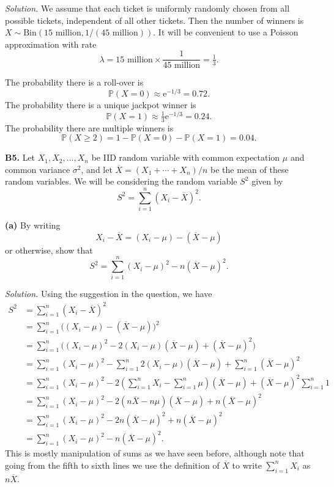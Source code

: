 \documentclass[
  a4paper,
]{book}
\theoremstyle{definition}
\theoremstyle{definition}
\theoremstyle{definition}
\theoremstyle{definition}
\theoremstyle{remark}
\begin{document}
\begin{myanswers}
\emph{Solution.}
We assume that each ticket is uniformly randomly chosen from all possible tickets, independent of all other tickets. Then the number of winners is \(X \sim \text{Bin}(15 \text{ million}, 1/(45 \text{ million}))\).
It will be convenient to use a Poisson approximation with rate
\[ \lambda = 15 \text{ million} \times \frac{1}{45 \text{ million}} = \tfrac13 .  \]

The probability there is a roll-over is
\[ \mathbb P(X = 0) \approx \mathrm e^{-1/3} = 0.72 . \]
The probability there is a unique jackpot winner is
\[ \mathbb P(X = 1) \approx \tfrac13 \mathrm e^{-1/3} = 0.24 . \]
The probability there are multiple winners is
\[ \mathbb P(X \geq 2) = 1 - \mathbb P(X = 0) - \mathbb P(X = 1) = 0.04  . \]

\end{myanswers}

\textbf{B5.} Let \(X_1, X_2, \dots, X_n\) be IID random variable with common expectation \(\mu\) and common variance \(\sigma^2\), and let \(\overline X = (X_1 + \cdots + X_n)/n\) be the mean of these random variables. We will be considering the random variable \(S^2\) given by
\[ S^2 = \sum_{i=1}^n (X_i - \overline X)^2 . \]

\textbf{(a)} By writing
\[ X_i - \overline X = (X_i - \mu) - (\overline X - \mu)  \]
or otherwise, show that
\[ S^2 = \sum_{i=1}^n (X_i - \mu)^2 - n(\overline X - \mu)^2 . \]

\begin{myanswers}
\emph{Solution.}
Using the suggestion in the question, we have
\begin{align*}
S^2 &= \sum_{i=1}^n (X_i - \overline X)^2 \\
  &= \sum_{i=1}^n \big( (X_i - \mu) - (\overline X - \mu)  \big)^2 \\
  &= \sum_{i=1}^n \big( (X_i - \mu)^2 - 2(X_i - \mu)(\overline X - \mu) + (\overline X - \mu)^2\big) \\
  &= \sum_{i=1}^n (X_i - \mu)^2 - \sum_{i=1}^n 2(X_i - \mu)(\overline X - \mu) + \sum_{i=1}^n (\overline X - \mu)^2 \\
  &= \sum_{i=1}^n (X_i - \mu)^2 - 2\left(\sum_{i=1}^n X_i - \sum_{i=1}^n \mu\right)(\overline X - \mu)  + (\overline X - \mu)^2 \sum_{i=1}^n 1 \\
  &= \sum_{i=1}^n (X_i - \mu)^2 - 2(n\overline X - n\mu) (\overline X - \mu) + n (\overline X - \mu)^2 \\
  &= \sum_{i=1}^n (X_i - \mu)^2 - 2n(\overline X - \mu)^2 + n(\overline X - \mu)^2 \\
  &= \sum_{i=1}^n (X_i - \mu)^2 - n(\overline X - \mu)^2 .
\end{align*}
This is mostly manipulation of sums as we have seen before, although note that going from the fifth to sixth lines we use the definition of \(\overline X\) to write \(\sum_{i=1}^n X_i\) as \(n \overline X\).

\end{myanswers}
\end{document}

